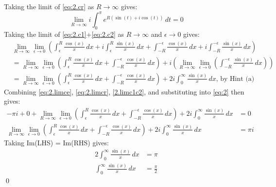 \documentclass[a4paper, titlepage, DIV=14]{scrartcl}
\begin{document}
    Taking the limit of \eqref{eq:2.cr} as $R\to\infty$ gives:
    \begin{equation}
        \lim_{R\to\infty} i\int_{0}^{\pi}e^{R(\sin(t)+i\cos(t))} \, dt = 0 \label{eq:2.limcr}
    \end{equation}
    Taking the limit of \eqref{eq:2.c1}+\eqref{eq:2.c2} as $R\to\infty$ and $\epsilon\to0$ gives:
    \begin{align}
        &\lim_{R\to\infty}\lim_{\epsilon\to0} (\int_{\epsilon}^{R} \frac{\cos(x)}{x} \, dx + i\int_{\epsilon}^{R} \frac{\sin(x)}{x} \, dx + \int_{-R}^{-\epsilon} \frac{\cos(x)}{x} \, dx + i\int_{-R}^{-\epsilon} \frac{\sin(x)}{x} \, dx) \nonumber\\
        &= \lim_{R\to\infty}\lim_{\epsilon\to0}(\int_{\epsilon}^{R} \frac{\cos(x)}{x} \, dx + \int_{-R}^{-\epsilon} \frac{\cos(x)}{x} \, dx) + i (\lim_{R\to\infty}\lim_{\epsilon\to0}(\int_{-R}^{-\epsilon} \frac{\sin(x)}{x} \, dx)) \nonumber\\
        &= \lim_{R\to\infty}\lim_{\epsilon\to0}(\int_{\epsilon}^{R} \frac{\cos(x)}{x} \, dx + \int_{-R}^{-\epsilon} \frac{\cos(x)}{x} \, dx) + 2i\int_{0}^{\infty}\frac{\sin(x)}{x}\, dx, \, \text{by Hint (a)} \label{2.limc1c2}
    \end{align}
    Combining \eqref{eq:2.limce}, \eqref{eq:2.limcr}, \eqref{2.limc1c2}, and substituting into \eqref{eq:2} then gives:
    \begin{align*}
        -\pi i + 0 + \lim_{R\to\infty}\lim_{\epsilon\to0}(\int_{\epsilon}^{R} \frac{\cos(x)}{x} \, dx + \int_{-R}^{-\epsilon} \frac{\cos(x)}{x} \, dx) + 2i\int_{0}^{\infty}\frac{\sin(x)}{x}\, dx &= 0 \\
        \lim_{R\to\infty}\lim_{\epsilon\to0}(\int_{\epsilon}^{R} \frac{\cos(x)}{x} \, dx + \int_{-R}^{-\epsilon} \frac{\cos(x)}{x} \, dx) + 2i\int_{0}^{\infty}\frac{\sin(x)}{x}\, dx &= \pi i
    \end{align*}
    Taking Im(LHS) = Im(RHS) gives:
    \begin{align*}
        2\int_{0}^{\infty}\frac{\sin(x)}{x}\, dx &= \pi \\
        \int_{0}^{\infty}\frac{\sin(x)}{x}\, dx &= \frac{\pi}{2} 
    \end{align*} \qed
    
\end{document}
